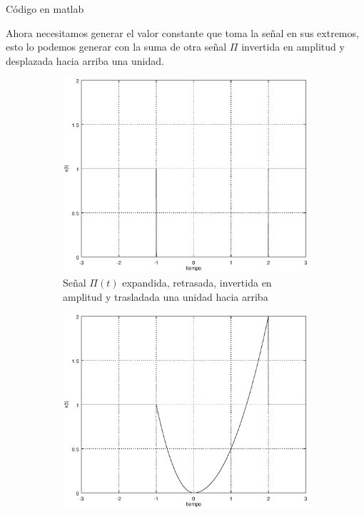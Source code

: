 \documentclass[10pt,a4paper]{report}
\begin{document}
Código en matlab



Ahora necesitamos generar el valor constante que toma la señal en sus extremos, esto lo podemos generar con la suma de otra señal $\Pi$ invertida en amplitud y desplazada hacia arriba una unidad.

\begin{figure}[H]
  \begin{center}
    
    \begin{subfigure}{0.5\textwidth}
      \begin{center}
        \includegraphics[width=1\linewidth]{Ejercicio1/Aproximacion3a}
        \caption{Señal $\Pi(t)$ expandida, retrasada, invertida en amplitud y trasladada una unidad hacia arriba}
        \label{fig:Aprox3a}
      \end{center}
    \end{subfigure}%
    \begin{subfigure}{0.5\textwidth}
      \begin{center}
        \includegraphics[width=1\linewidth]{Ejercicio1/Aproximacion3b}

\end{center}
\end{subfigure}
\end{center}
\end{figure}
\end{document}
